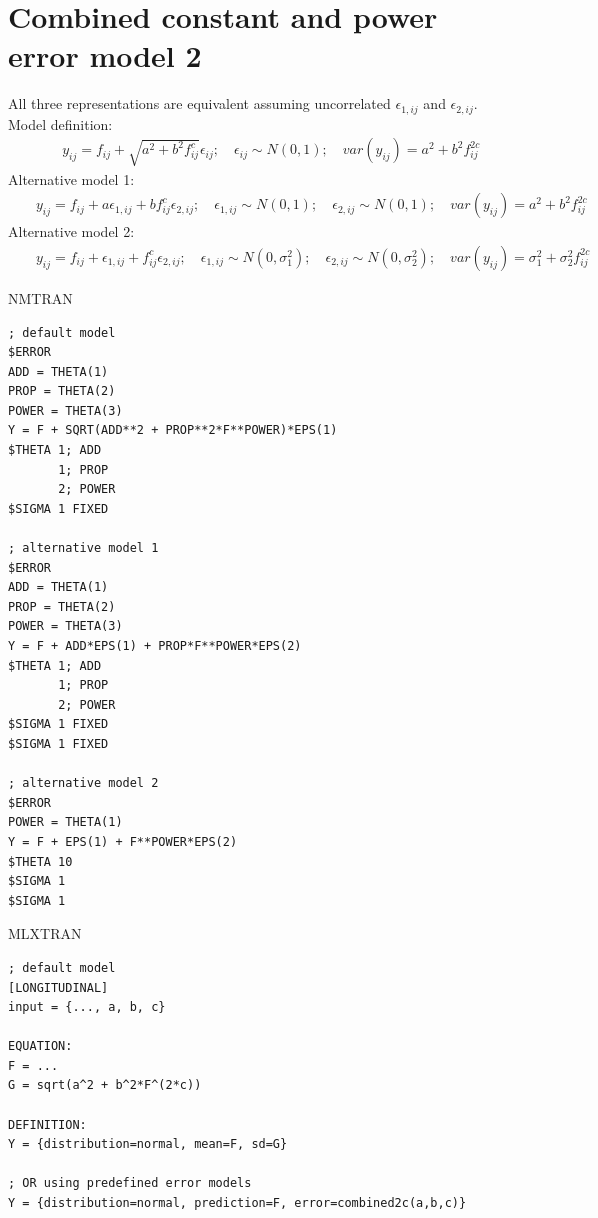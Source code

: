 \section{Combined constant and power error model 2}
\label{model7}
All three representations are equivalent assuming uncorrelated $\epsilon_{1,ij}$ 
and $\epsilon_{2,ij}$.\\
\bigskip
Model definition: 
\begin{eqnarray}
&& y_{ij} = f_{ij} + \sqrt{a^2 + b^2 f_{ij}^c} \epsilon_{ij}; \quad \epsilon_{ij} \sim N(0,1); \quad \mathit{var}(y_{ij}) = a^2 + b^2f_{ij}^{2c} \nonumber
\end{eqnarray}
Alternative model 1:
\begin{eqnarray}
&& y_{ij} = f_{ij} + a\epsilon_{1,ij} + b f_{ij}^c \epsilon_{2,ij}; \quad \epsilon_{1,ij} \sim N(0,1); \quad \epsilon_{2,ij} \sim N(0,1); \quad \mathit{var}(y_{ij}) = a^2 + b^2f_{ij}^{2c} \nonumber
\end{eqnarray}
Alternative model 2:
\begin{eqnarray}
&& y_{ij} = f_{ij} + \epsilon_{1,ij} + f_{ij}^c \epsilon_{2,ij}; \quad \epsilon_{1,ij} \sim N(0,\sigma_1^2); \quad \epsilon_{2,ij} \sim N(0,\sigma_2^2);\quad  \mathit{var}(y_{ij}) = \sigma_1^2 + \sigma_2^2f_{ij}^{2c} \nonumber
\end{eqnarray}


\bigskip
\begin{lrbox}{\lstbox}\begin{minipage}{16cm}
NMTRAN
\begin{lstlisting}[frame=single,language=NM]
; default model
$ERROR
ADD = THETA(1)
PROP = THETA(2)
POWER = THETA(3)
Y = F + SQRT(ADD**2 + PROP**2*F**POWER)*EPS(1)
$THETA 1; ADD
	   1; PROP
	   2; POWER
$SIGMA 1 FIXED

; alternative model 1
$ERROR
ADD = THETA(1)
PROP = THETA(2)
POWER = THETA(3)
Y = F + ADD*EPS(1) + PROP*F**POWER*EPS(2)
$THETA 1; ADD
	   1; PROP
	   2; POWER
$SIGMA 1 FIXED
$SIGMA 1 FIXED

; alternative model 2
$ERROR
POWER = THETA(1)
Y = F + EPS(1) + F**POWER*EPS(2)
$THETA 10
$SIGMA 1
$SIGMA 1
\end{lstlisting}   
\end{minipage}\end{lrbox}
\usebox\lstbox


\begin{lrbox}{\lstbox}\begin{minipage}{16cm}
MLXTRAN
\begin{lstlisting}[frame=single,language=MLX]
; default model
[LONGITUDINAL]
input = {..., a, b, c}

EQUATION:
F = ...
G = sqrt(a^2 + b^2*F^(2*c))

DEFINITION:
Y = {distribution=normal, mean=F, sd=G}

; OR using predefined error models
Y = {distribution=normal, prediction=F, error=combined2c(a,b,c)}
\end{lstlisting}   
\end{minipage}\end{lrbox}
\usebox\lstbox


